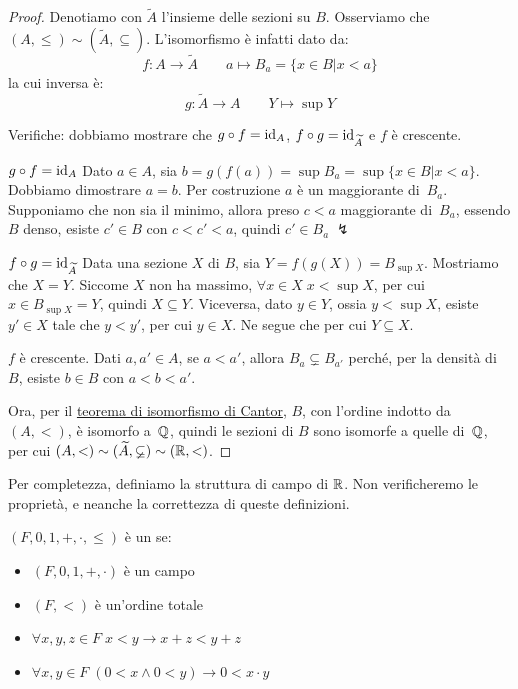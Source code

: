 \begin{proof}
	Denotiamo con $\widetilde{A}$ l'insieme delle sezioni {\drkred su
$B$}.
	Osserviamo che $(A,\leq) \sim (\widetilde{A},\subseteq)$.
	L'isomorfismo \`e infatti dato da:
	\[ f \colon A \rightarrow \widetilde{A} \qquad a \mapsto B_a = \{x \in B | x < a\}
		\]
	la cui inversa \`e:
	\[ g \colon \widetilde{A} \rightarrow A \qquad Y \mapsto \sup Y
		\]

	Verifiche: dobbiamo mostrare che $g \circ f = \operatorname{id}_A$, $f \circ g =
\operatorname{id}_{\widetilde{A}}$ e $f$ \`e crescente.
	
{\drkblu $g \circ f = \operatorname{id}_A$} Dato $a \in A$, sia $b = g(f(a)) = \sup B_a
= \sup\{x \in B | x < a\}$. Dobbiamo dimostrare $a=b$. Per costruzione $a$
\`e un maggiorante di~$B_a$. Supponiamo che non sia il minimo, allora
			preso $c < a$ maggiorante di~$B_a$, essendo $B$
denso, esiste $c'\in B$ con $c < c' < a$, quindi $c' \in B_a\;\lightning$

{\drkblu $f \circ g = \operatorname{id}_{\widetilde{A}}$} Data una sezione $X$ di $B$,
sia $Y = f(g(X)) = B_{\sup X}$. Mostriamo che $X = Y$. Siccome $X$ non ha
massimo, $\forall {x \in X} \; x < \sup X$, 
			per cui $x \in B_{\sup X}=Y$, quindi $X \subseteq
Y$. Viceversa, dato $y\in Y$, ossia $y < \sup X$, esiste $y' \in X$ tale
che $y < y'$, per cui $y \in X$. Ne segue che  per cui $Y \subseteq X$.

{\drkblu $f$ \`e crescente.} Dati $a,a' \in A$, se $a<a'$, allora $B_a
\subsetneq B_{a'}$ perch\'e, per la densit\`a di~$B$, esiste $b\in B$ con
$a<b<a'$.

	Ora, per il \hyperref[isoCantor]{teorema di isomorfismo di
Cantor}, $B$, con l'ordine indotto da~$(A,<)$, \`e isomorfo a~$\mathbb Q$,
quindi le sezioni di $B$ sono isomorfe a quelle di~$\mathbb Q$, per cui $(A,<)
\sim (\widetilde{A},\varsubsetneq) \sim (\mathbb R, <)$.
\end{proof}

Per completezza, definiamo la struttura di campo di $\mathbb R$. Non verificheremo le propriet\`a, e neanche la correttezza di queste definizioni.

\begin{definition}
	$(F,0,1,+,\cdot,\leq)$ \`e un  se:
	\begin{itemize}
		\item $(F,0,1,+,\cdot)$ \`e un campo
		\item $(F,<)$ \`e un'ordine totale
		\item $\forall {x,y,z \in F} \; x < y \rightarrow x + z < y + z$
		\item $\forall {x,y \in F} \; (0 < x \land 0 < y) \rightarrow 0 < x \cdot y$
	\end{itemize}
\end{definition}

